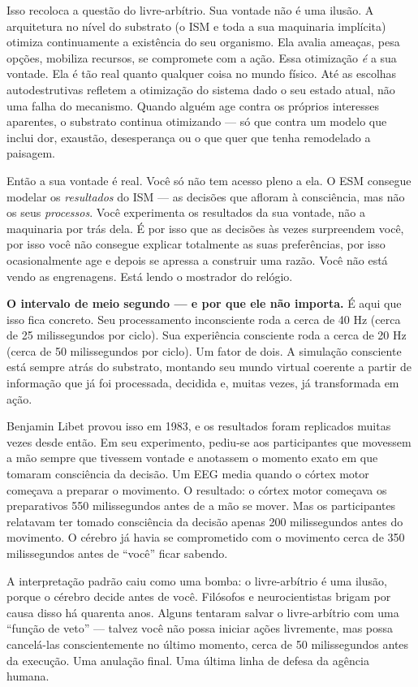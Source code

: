\documentclass[11pt, twoside, openright]{book}
\begin{document}
Isso recoloca a questão do livre-arbítrio. Sua vontade não é uma ilusão. A arquitetura no nível do substrato (o ISM e toda a sua maquinaria implícita) otimiza continuamente a existência do seu organismo. Ela avalia ameaças, pesa opções, mobiliza recursos, se compromete com a ação. Essa otimização \textit{é} a sua vontade. Ela é tão real quanto qualquer coisa no mundo físico. Até as escolhas autodestrutivas refletem a otimização do sistema dado o seu estado atual, não uma falha do mecanismo. Quando alguém age contra os próprios interesses aparentes, o substrato continua otimizando --- só que contra um modelo que inclui dor, exaustão, desesperança ou o que quer que tenha remodelado a paisagem.

Então a sua vontade é real. Você só não tem acesso pleno a ela. O ESM consegue modelar os \textit{resultados} do ISM --- as decisões que afloram à consciência, mas não os seus \textit{processos}. Você experimenta os resultados da sua vontade, não a maquinaria por trás dela. É por isso que as decisões às vezes surpreendem você, por isso você não consegue explicar totalmente as suas preferências, por isso ocasionalmente age e depois se apressa a construir uma razão. Você não está vendo as engrenagens. Está lendo o mostrador do relógio.

\textbf{O intervalo de meio segundo --- e por que ele não importa.} É aqui que isso fica concreto. Seu processamento inconsciente roda a cerca de 40 Hz (cerca de 25 milissegundos por ciclo). Sua experiência consciente roda a cerca de 20 Hz (cerca de 50 milissegundos por ciclo). Um fator de dois. A simulação consciente está sempre atrás do substrato, montando seu mundo virtual coerente a partir de informação que já foi processada, decidida e, muitas vezes, já transformada em ação.

Benjamin Libet provou isso em 1983, e os resultados foram replicados muitas vezes desde então. Em seu experimento, pediu-se aos participantes que movessem a mão sempre que tivessem vontade e anotassem o momento exato em que tomaram consciência da decisão. Um EEG media quando o córtex motor começava a preparar o movimento. O resultado: o córtex motor começava os preparativos 550 milissegundos antes de a mão se mover. Mas os participantes relatavam ter tomado consciência da decisão apenas 200 milissegundos antes do movimento. O cérebro já havia se comprometido com o movimento cerca de 350 milissegundos antes de ``você'' ficar sabendo.

A interpretação padrão caiu como uma bomba: o livre-arbítrio é uma ilusão, porque o cérebro decide antes de você. Filósofos e neurocientistas brigam por causa disso há quarenta anos. Alguns tentaram salvar o livre-arbítrio com uma ``função de veto'' --- talvez você não possa iniciar ações livremente, mas possa cancelá-las conscientemente no último momento, cerca de 50 milissegundos antes da execução. Uma anulação final. Uma última linha de defesa da agência humana.
\end{document}
